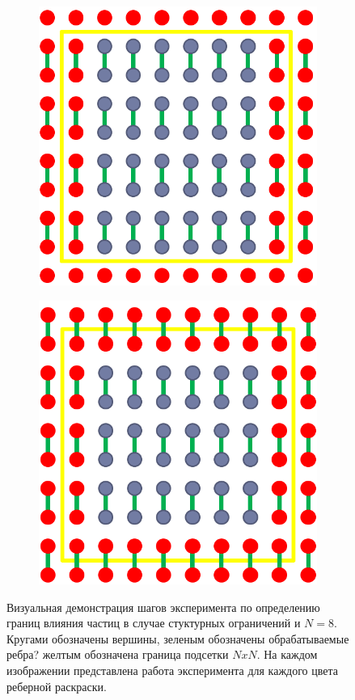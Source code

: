 \begin{figure}[ht]
		\begin{subfigure}[t]{\dimexpr.5\linewidth-1.3em\relax}
			\centering
			\includegraphics[width=.65\linewidth,valign=t]{my_folder/images/chunk_structural_3}
		\end{subfigure}%
		\hfill %
		\begin{subfigure}[t]{\dimexpr.5\linewidth-1.3em\relax}
			\centering
			\includegraphics[width=.65\linewidth,valign=t]{my_folder/images/chunk_structural_4}
		\end{subfigure}
		\captionsetup{justification=centering} %
		\caption{Визуальная демонстрация шагов эксперимента по определению границ влияния частиц в случае стуктурных ограничений и $N = 8$. Кругами обозначены вершины, зеленым обозначены обрабатываемые ребра? желтым обозначена граница подсетки $NxN$. На каждом изображении представлена работа эксперимента для каждого цвета реберной раскраски.}
		\label{fig:chunkStructExp}
	\end{figure}
	
